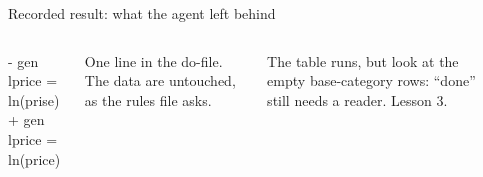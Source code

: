\begin{frame}{Recorded result: what the agent left behind}
  \begin{columns}[T,onlytextwidth]
      \begin{tcolorbox}[l1base,colback=white,borderline={0.4pt}{0pt}{hair},left=0.6em,top=0.4em,bottom=0.4em]
        \ttfamily\footnotesize
        {\color{bad}- gen lprice = ln(prise)}\\
        {\color{good}+ gen lprice = ln(price)}
      \end{tcolorbox}
      \vspace{0.9em}
      {\small\color{muted}One line in the do-file. The data are untouched, as the rules file asks.\par}
      \vspace{0.9em}
      {\small\color{muted}The table runs, but look at the empty base-category rows: ``done'' still needs a reader. Lesson 3.\par}
      \begin{tcolorbox}[l1base,colback=white,borderline={0.4pt}{0pt}{hair},halign=center,top=0.3em,bottom=0.3em]
        \resizebox*{!}{5.3cm}{}
      \end{tcolorbox}
  \end{columns}
\end{frame}
